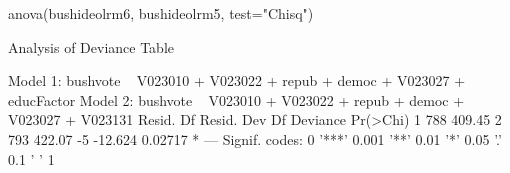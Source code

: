 \begin{Schunk}
\begin{Sinput}
 anova(bushideolrm6, bushideolrm5, test="Chisq")
\end{Sinput}
\begin{Soutput}
Analysis of Deviance Table

Model 1: bushvote ~ V023010 + V023022 + repub + democ + V023027 + educFactor
Model 2: bushvote ~ V023010 + V023022 + repub + democ + V023027 + V023131
  Resid. Df Resid. Dev Df Deviance Pr(>Chi)  
1       788     409.45                       
2       793     422.07 -5  -12.624  0.02717 *
---
Signif. codes:  0 '***' 0.001 '**' 0.01 '*' 0.05 '.' 0.1 ' ' 1
\end{Soutput}
\end{Schunk}
